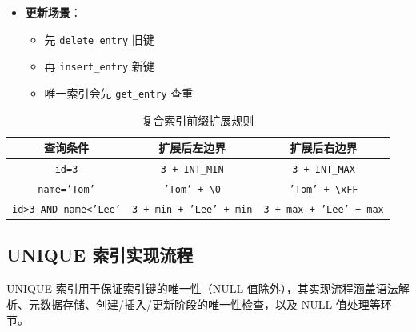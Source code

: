\documentclass[a4paper, 12pt]{article}
\begin{document}
\begin{enumerate}
\begin{itemize}
\begin{lstlisting}[language=C++]
RC BplusTreeIndex::delete_entry(const char *record, const RID *rid) {
    char key_buf[key_len_];
    build_composite_key(record, key_buf);
    return index_handler_.delete_entry(key_buf, rid);
}

RC BplusTreeIndex::get_entry(const char *key, int key_len, list<RID> &rids) {
    return index_handler_.get_entry(key, key_len, rids);
}
        \end{lstlisting}
        \item \textbf{更新场景}：
        
\begin{itemize}
            \item 先 \texttt{delete\_entry} 旧键
            \item 再 \texttt{insert\_entry} 新键
            \item 唯一索引会先 \texttt{get\_entry} 查重
        \end{itemize}
    \end{itemize}
\end{enumerate}

\begin{table}[h]
\centering
\begin{tabular}{|c|c|c|}
\hline
\textbf{查询条件} & \textbf{扩展后左边界} & \textbf{扩展后右边界} \\
\hline
\texttt{id=3} & \texttt{3 + INT\_MIN} & \texttt{3 + INT\_MAX} \\
\hline
\texttt{name='Tom'} & \texttt{'Tom' + \textbackslash{}0} & \texttt{'Tom' + \textbackslash{}xFF} \\
\hline
\texttt{id>3 AND name<'Lee'} & \texttt{3 + min + 'Lee' + min} & \texttt{3 + max + 'Lee' + max} \\
\hline
\end{tabular}
\caption{复合索引前缀扩展规则}
\end{table}

\subsection{\heiti UNIQUE 索引实现流程}
UNIQUE 索引用于保证索引键的唯一性（NULL 值除外），其实现流程涵盖语法解析、元数据存储、创建/插入/更新阶段的唯一性检查，以及 NULL 值处理等环节。
\end{document}
